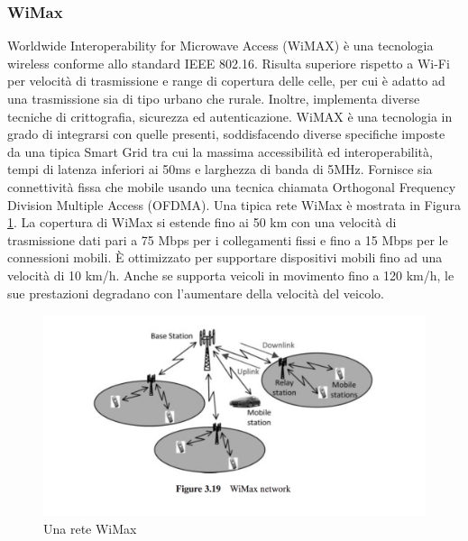 \subsubsection{WiMax}
Worldwide Interoperability for Microwave Access (WiMAX) è una tecnologia wireless conforme allo standard IEEE 802.16. Risulta superiore rispetto a Wi-Fi per velocità di trasmissione e range di copertura delle celle, per cui è adatto ad una trasmissione sia di tipo urbano che rurale. Inoltre, implementa diverse tecniche di crittografia, sicurezza ed autenticazione. WiMAX è una tecnologia in grado di integrarsi con quelle presenti, soddisfacendo diverse specifiche imposte da una tipica Smart Grid tra cui la massima accessibilità ed interoperabilità, tempi di latenza inferiori ai 50ms e larghezza di banda di 5MHz. Fornisce sia connettività fissa che mobile usando una tecnica chiamata Orthogonal Frequency Division Multiple Access (OFDMA). Una tipica rete WiMax è mostrata in Figura \ref{fig:wim}. La copertura di WiMax si estende fino ai 50 km con una velocità di trasmissione dati pari a 75 Mbps per i collegamenti fissi e fino a 15 Mbps per le connessioni mobili. È ottimizzato per supportare dispositivi mobili fino ad una velocità di 10 km/h. Anche se supporta veicoli in movimento fino a 120 km/h, le sue prestazioni degradano con l'aumentare della velocità del veicolo\cite{wimax}.
\begin{figure}[h]
	\centering
	\includegraphics[scale=0.350]{imgs/wim.png}
	\caption{Una rete WiMax} \label{fig:wim}
\end{figure}
\newpage
